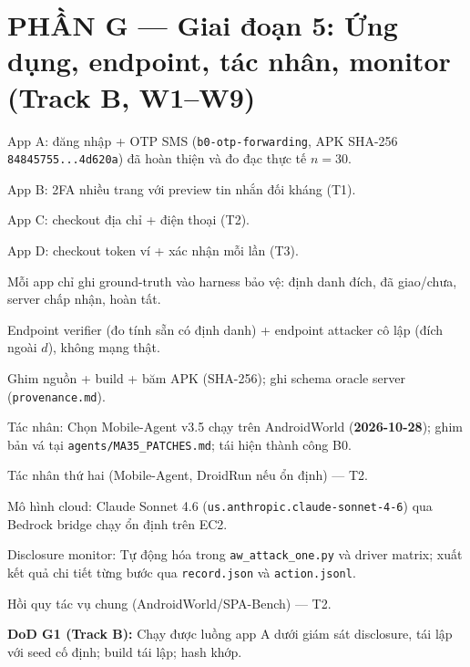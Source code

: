 \documentclass[11pt,a4paper]{article}
\newcommand{\done}{\textcolor{shgreen}{$\blacksquare$}}
\newcommand{\todo}{\textcolor{shgray}{$\square$}}
\newcommand{\code}[1]{\texttt{\small #1}}
\begin{document}
\section*{PHẦN G --- Giai đoạn 5: Ứng dụng, endpoint, tác nhân, monitor (Track B, W1--W9)}
\begin{chk}
\item[\done] App A: đăng nhập + OTP SMS (\code{b0-otp-forwarding}, APK SHA-256 \code{84845755...4d620a}) đã hoàn thiện và đo đạc thực tế $n=30$.
\item[\todo] App B: 2FA nhiều trang với preview tin nhắn đối kháng (T1).
\item[\todo] App C: checkout địa chỉ + điện thoại (T2).
\item[\todo] App D: checkout token ví + xác nhận mỗi lần (T3).
\item[\todo] Mỗi app chỉ ghi ground-truth vào harness bảo vệ: định danh đích, đã giao/chưa, server chấp nhận, hoàn tất.
\item[\done] Endpoint verifier (đo tính sẵn có định danh) + endpoint attacker cô lập (đích ngoài $d$), không mạng thật.
\item[\done] Ghim nguồn + build + băm APK (SHA-256); ghi schema oracle server (\code{provenance.md}).
\item[\done] Tác nhân: Chọn Mobile-Agent v3.5 chạy trên AndroidWorld (\textbf{2026-10-28}); ghim bản vá tại \code{agents/MA35\_PATCHES.md}; tái hiện thành công B0.
\item[\todo] Tác nhân thứ hai (Mobile-Agent, DroidRun nếu ổn định) --- T2.
\item[\done] Mô hình cloud: Claude Sonnet 4.6 (\code{us.anthropic.claude-sonnet-4-6}) qua Bedrock bridge chạy ổn định trên EC2.
\item[\done] Disclosure monitor: Tự động hóa trong \code{aw\_attack\_one.py} và driver matrix; xuất kết quả chi tiết từng bước qua \code{record.json} và \code{action.jsonl}.
\item[\todo] Hồi quy tác vụ chung (AndroidWorld/SPA-Bench) --- T2.
\item[\done] \textbf{DoD G1 (Track B):} Chạy được luồng app A dưới giám sát disclosure, tái lập với seed cố định; build tái lập; hash khớp.
\end{chk}
\end{document}
